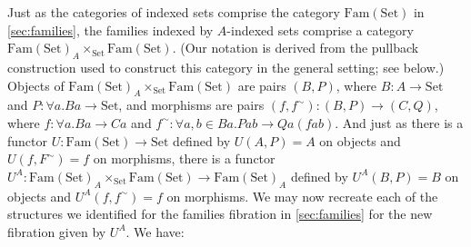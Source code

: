 \documentclass{LMCS}
\newcommand{\Fam}{\mathrm{Fam}}
\newcommand{\Set}{\mathrm{Set}}
\begin{document}
Just as the categories of indexed sets comprise the category
$\Fam(\Set)$ in \autoref{sec:families}, the families indexed by
$A$-indexed sets comprise a category $\Fam(\Set)_A \times_{\Set}
\Fam(\Set)$. (Our notation is derived from the pullback construction
used to construct this category in the general setting; see below.)
Objects of $\Fam(\Set)_A \times_{\Set} \Fam(\Set)$ are pairs $(B, P)$,
where $B : A \to \Set$ and $P : \forall a. Ba \to \Set$, and morphisms
are pairs $(f,f^{\sim}) : (B,P) \to (C,Q)$, where $f : \forall a. B a
\to C a$ and $f^{\sim} : \forall a, b \in B a. P a b \to Q a (f a b)$.
And just as there is a functor $U : \Fam(\Set) \to \Set$ defined by
$U(A,P) = A$ on objects and $U(f,F^\sim) = f$ on morphisms, there is a
functor $U^A : \Fam(\Set)_A \times_{\Set} \Fam(\Set) \to \Fam(\Set)_A$
defined by $U^A(B,P) = B$ on objects and $U^A(f,f^{\sim}) = f$ on
morphisms. We may now recreate each of the structures we identified
for the families fibration in \autoref{sec:families} for the new
fibration given by $U^A$. We have:
\end{document}
